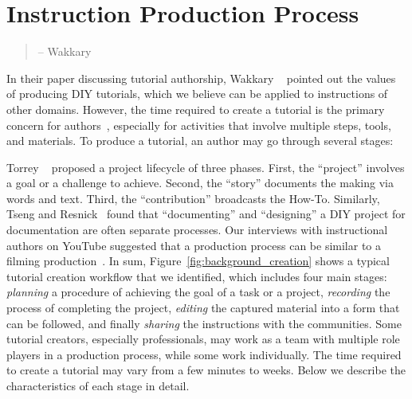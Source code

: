 
\section{Instruction Production Process}
\label{background_creation}

\begin{quote}
 -- Wakkary \ea{}~\cite{Wakkary:2015:TAH:2702123.2702550}
\end{quote}

In their paper discussing tutorial authorship, Wakkary \ea{}~\cite{Wakkary:2015:TAH:2702123.2702550} pointed out the values of producing DIY tutorials, which we believe can be applied to instructions of other domains. However, the time required to create a tutorial is the primary concern for authors~\cite{Kuznetsov:2010:REA:1868914.1868950,Tseng:2014:PVP:2598510.2598540}, especially for activities that involve multiple steps, tools, and materials. To produce a tutorial, an author may go through several stages:

Torrey \ea{}~\cite{Torrey:2007he} proposed a project lifecycle of three phases. First, the ``project'' involves a goal or a challenge to achieve. Second, the ``story'' documents the making via words and text. Third, the ``contribution'' broadcasts the How-To.
%
Similarly, Tseng and Resnick~\cite{Tseng:2014:PVP:2598510.2598540} found that ``documenting'' and ``designing'' a DIY project for documentation are often separate processes.
%
Our interviews with instructional authors on YouTube suggested that a production process can be similar to a filming production~\cite{Chi:2013:DGC:2501988.2502052,pincus2012the}.
%
In sum, Figure~\ref{fig:background_creation} shows a typical tutorial creation workflow that we identified, which includes four main stages: \emph{planning} a procedure of achieving the goal of a task or a project, \emph{recording} the process of completing the project, \emph{editing} the captured material into a form that can be followed, and finally \emph{sharing} the instructions with the communities.
%
Some tutorial creators, especially professionals, may work as a team with multiple role players in a production process, while some work individually. The time required to create a tutorial may vary from a few minutes to weeks.
%
Below we describe the characteristics of each stage in detail.

